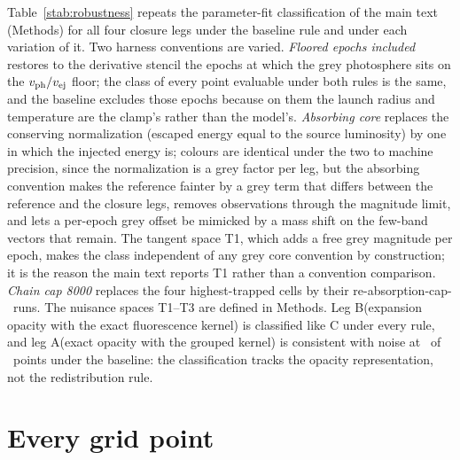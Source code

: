 \documentclass[11pt]{article}
\newcommand{\Cboth}{C\xspace}
\newcommand{\Aleg}{A\xspace}
\newcommand{\Bleg}{B\xspace}
\newcommand{\vej}{v_{\rm ej}}
\begin{document}
Table~\ref{stab:robustness} repeats the parameter-fit classification of the main text (Methods) for all four closure legs under the baseline rule and under each variation of it. Two harness conventions are varied. \emph{Floored epochs included} restores to the derivative stencil the epochs at which the grey photosphere sits on the $v_{\rm ph}/\vej$ floor; the class of every point evaluable under both rules is the same, and the baseline excludes those epochs because on them the launch radius and temperature are the clamp's rather than the model's. \emph{Absorbing core} replaces the conserving normalization (escaped energy equal to the source luminosity) by one in which the injected energy is; colours are identical under the two to machine precision, since the normalization is a grey factor per leg, but the absorbing convention makes the reference fainter by a grey term that differs between the reference and the closure legs, removes observations through the magnitude limit, and lets a per-epoch grey offset be mimicked by a mass shift on the few-band vectors that remain. The tangent space T1, which adds a free grey magnitude per epoch, makes the class independent of any grey core convention by construction; it is the reason the main text reports T1 rather than a convention comparison. \emph{Chain cap 8000} replaces the four highest-trapped cells by their re-absorption-cap-\ChainTop\ runs. The nuisance spaces T1--T3 are defined in Methods. Leg \Bleg (expansion opacity with the exact fluorescence kernel) is classified like \Cboth under every rule, and leg \Aleg (exact opacity with the grouped kernel) is consistent with noise at \ControlCC\ of \ControlN\ points under the baseline: the classification tracks the opacity representation, not the redistribution rule.

\begin{table}[h]
\centering
\caption{\textbf{Gate 2 summary for every leg, rule and tangent space.} $n$ is the number of grid points with an evaluable fit; C-C, C-A and C-B are the classes of Methods; \emph{underdet.} counts points with fewer than four residual degrees of freedom. Medians are over the evaluable, determined points.}
\label{stab:robustness}
\resizebox{\textwidth}{!}{}
\end{table}

\section{Every grid point}\label{ssec:points}
\end{document}
